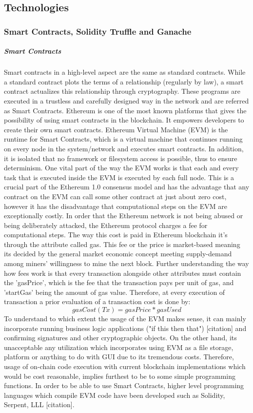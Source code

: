 \subsection{Technologies}


\subsubsection{Smart Contracts, Solidity Truffle and Ganache}

\subparagraph{Smart Contracts} 
Smart contracts in a high-level aspect are the same as standard contracts. While a standard contract plots the terms of a relationship (regularly by law), a smart contract actualizes this relationship through cryptography. These programs are executed in a trustless and carefully designed way in the network and are referred as Smart Contracts. Ethereum is one of the most known platforms that gives the possibility of using smart contracts in the blockchain. It empowers developers to create their own smart contracts. Ethereum Virtual Machine (EVM) is the runtime for Smart Contracts, which is a virtual machine that continues running on every node in the system/network and executes smart contracts. In addition, it is isolated that no framework or filesystem access is possible, thus to ensure determinism. One vital part of the way the EVM works is that each and every task that is executed inside the EVM is executed by each full node. This is a crucial part of the Ethereum 1.0 consensus model and has the advantage that any contract on the EVM can call some other contract at just about zero cost, however it has the disadvantage that computational steps on the EVM are exceptionally costly. In order that the Ethereum network is not being abused or being deliberately attacked, the Ethereum protocol charges a fee for computational steps. The way this cost is paid in Ethereum blockchain it’s through the attribute called gas.  This fee or the price is market-based meaning its decided by the general market economic concept meeting supply-demand among miners’ willingness to mine the next block. Further understanding the way how fees work is that every transaction alongside other attributes must contain the 'gasPrice', which is the fee that the transaction pays per unit of gas, and 'startGas' being the amount of gas value. Therefore, at every execution of transaction a prior evaluation of a transaction cost is done by: 
				\[ gasCost(Tx)= {gasPrice *  gasUsed}\]
To understand to which extent the usage of the EVM makes sense, it can mainly incorporate running business logic applications ("if this then that") [citation] and confirming signatures and other cryptographic objects. On the other hand, its unacceptable any utilization which incorporates using EVM as a file storage, platform or anything to do with GUI due to its tremendous costs. Therefore, usage of on-chain code execution with current blockchain implementations which would be cost reasonable, implies furthest to be to some simple programming functions.  In order to be able to use Smart Contracts, higher level programming languages which compile EVM code have been developed such as Solidity, Serpent, LLL [citation].


